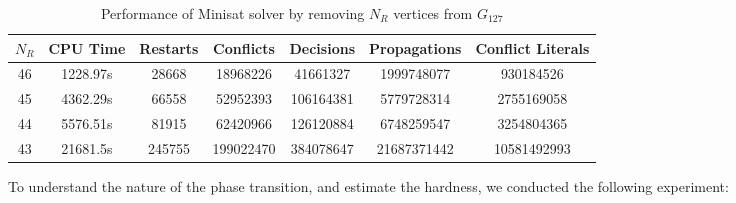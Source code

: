 \documentclass[paper=a4, fontsize=11pt]{scrartcl} %
\begin{document}
\begin{table}
	\caption{Performance of Minisat solver by removing $N_R$ vertices from $G_{127}$}
	\begin{tabular}{c | c | c | c | c | c | c}
		\hline
		$N_R$ & CPU Time & Restarts & Conflicts & Decisions & Propagations & Conflict Literals \\ \hline
		46 & 1228.97s & 28668 & 18968226 & 41661327 & 1999748077 & 930184526 \\ 
		45 & 4362.29s & 66558 & 52952393 & 106164381 & 5779728314 & 2755169058 \\ 
		44 & 5576.51s & 81915 & 62420966 & 126120884 & 6748259547 & 3254804365 \\ 
		43 & 21681.5s & 245755 & 199022470 & 384078647 & 21687371442 & 10581492993 \\ 
		\hline
	\end{tabular}
	\label{tab:performanceSat}
\end{table}

To understand the nature of the phase transition, and estimate the hardness, we conducted 
the following experiment:
\end{document}
